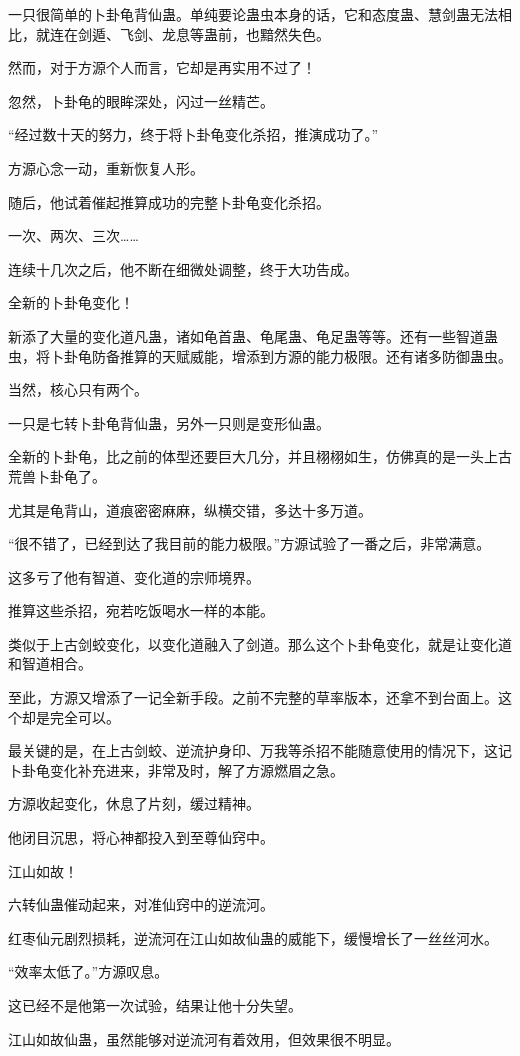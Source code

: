 \begin{this_body}
一只很简单的卜卦龟背仙蛊。单纯要论蛊虫本身的话，它和态度蛊、慧剑蛊无法相比，就连在剑遁、飞剑、龙息等蛊前，也黯然失色。

然而，对于方源个人而言，它却是再实用不过了！

忽然，卜卦龟的眼眸深处，闪过一丝精芒。

“经过数十天的努力，终于将卜卦龟变化杀招，推演成功了。”

方源心念一动，重新恢复人形。

随后，他试着催起推算成功的完整卜卦龟变化杀招。

一次、两次、三次……

连续十几次之后，他不断在细微处调整，终于大功告成。

全新的卜卦龟变化！

新添了大量的变化道凡蛊，诸如龟首蛊、龟尾蛊、龟足蛊等等。还有一些智道蛊虫，将卜卦龟防备推算的天赋威能，增添到方源的能力极限。还有诸多防御蛊虫。

当然，核心只有两个。

一只是七转卜卦龟背仙蛊，另外一只则是变形仙蛊。

全新的卜卦龟，比之前的体型还要巨大几分，并且栩栩如生，仿佛真的是一头上古荒兽卜卦龟了。

尤其是龟背山，道痕密密麻麻，纵横交错，多达十多万道。

“很不错了，已经到达了我目前的能力极限。”方源试验了一番之后，非常满意。

这多亏了他有智道、变化道的宗师境界。

推算这些杀招，宛若吃饭喝水一样的本能。

类似于上古剑蛟变化，以变化道融入了剑道。那么这个卜卦龟变化，就是让变化道和智道相合。

至此，方源又增添了一记全新手段。之前不完整的草率版本，还拿不到台面上。这个却是完全可以。

最关键的是，在上古剑蛟、逆流护身印、万我等杀招不能随意使用的情况下，这记卜卦龟变化补充进来，非常及时，解了方源燃眉之急。

方源收起变化，休息了片刻，缓过精神。

他闭目沉思，将心神都投入到至尊仙窍中。

江山如故！

六转仙蛊催动起来，对准仙窍中的逆流河。

红枣仙元剧烈损耗，逆流河在江山如故仙蛊的威能下，缓慢增长了一丝丝河水。

“效率太低了。”方源叹息。

这已经不是他第一次试验，结果让他十分失望。

江山如故仙蛊，虽然能够对逆流河有着效用，但效果很不明显。


\end{this_body}
